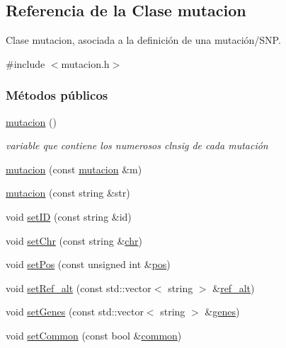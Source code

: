 \hypertarget{classmutacion}{}\subsection{Referencia de la Clase mutacion}
\label{classmutacion}


Clase mutacion, asociada a la definición de una mutación/\+S\+NP.  




{\ttfamily \#include $<$mutacion.\+h$>$}

\subsubsection*{Métodos públicos}
\begin{DoxyCompactItemize}
\item 
\hyperlink{classmutacion_a01cb8b2307eacbfb415f99373ff3c64a}{mutacion} ()
\begin{DoxyCompactList}\small\item\em variable que contiene los numerosos clnsig de cada mutación \end{DoxyCompactList}\item 
\hyperlink{classmutacion_a6bcb17c723a359ffac7dda8d5d427dfe}{mutacion} (const \hyperlink{classmutacion}{mutacion} \&m)
\item 
\hyperlink{classmutacion_a8c5cc5b5146c511b9a1d6976156389c3}{mutacion} (const string \&str)
\item 
void \hyperlink{classmutacion_af6288453d3cb4e29b8be304ca262b170}{set\+ID} (const string \&id)
\item 
void \hyperlink{classmutacion_a147ee1f35c78ab0b7cf891067bf2e336}{set\+Chr} (const string \&\hyperlink{classmutacion_a57651966b952f782240ff9cff72c5d2f}{chr})
\item 
void \hyperlink{classmutacion_a2667189a28d3ac983a8f63ca92e81fba}{set\+Pos} (const unsigned int \&\hyperlink{classmutacion_ae1487b8648d0eaad68de5e4e5a87f3ff}{pos})
\item 
void \hyperlink{classmutacion_af90752d5ce0e83943ea891ce995989f1}{set\+Ref\+\_\+alt} (const std\+::vector$<$ string $>$ \&\hyperlink{classmutacion_a2b3d0ed7547618562fae965d373b39e3}{ref\+\_\+alt})
\item 
void \hyperlink{classmutacion_a0cd370211bab4ae95120a68c57a92bed}{set\+Genes} (const std\+::vector$<$ string $>$ \&\hyperlink{classmutacion_af0048945b6062d6eb88b91db707993f6}{genes})
\item 
void \hyperlink{classmutacion_ab62d36e9bad78d43ace74fdaec909ca6}{set\+Common} (const bool \&\hyperlink{classmutacion_a6dabfef6167d64030f095887b15f65dd}{common})

\end{DoxyCompactItemize}
